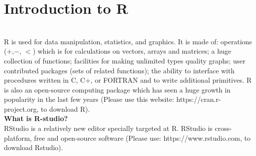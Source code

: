 \section{Introduction to R}\\

\noindent
R is used for data manipulation, statistics, and graphics. It is made of: operations ($+$,$ -$, $<$) which is for calculations on vectors, arrays and matrices; a huge collection of functions; facilities for making unlimited types quality graphs; user contributed packages (sets of related functions); the ability to interface with procedures written in C, C+, or FORTRAN and to write additional primitives. R is also an open-source computing package which has seen a huge growth in popularity in the last few years (Please use this website: https://cran.r-project.org, to download R).\\

\noindent
\textbf{What is R-studio?}\\

\noindent
RStudio is a relatively new editor specially targeted at R. RStudio is cross-platform, free and open-source software (Please use: https://www.rstudio.com, to download Rstudio).






